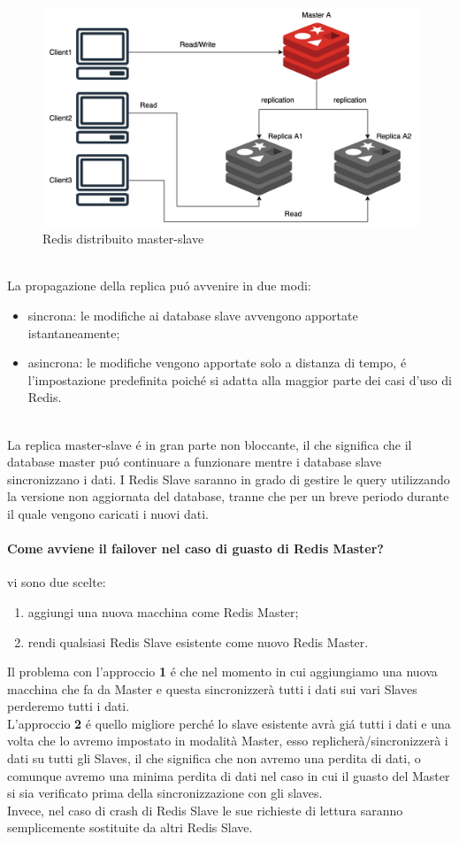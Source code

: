 \begin{figure}[H]
\includegraphics[width=1\textwidth]{img/masterslaveRedis}
\caption{Redis distribuito master-slave}
\end{figure}
\\
La propagazione della replica puó avvenire in due modi:
\begin{itemize}
    \item sincrona: le modifiche ai database slave avvengono apportate istantaneamente;
    \item asincrona: le modifiche vengono apportate solo a distanza di tempo, é l'impostazione predefinita poiché si adatta
    alla maggior parte dei casi d'uso di Redis.
\end{itemize}
\\
La replica master-slave é in gran parte non bloccante, il che significa che il database master puó continuare a funzionare
mentre i database slave sincronizzano i dati.
I Redis Slave saranno in grado di gestire le query utilizzando la versione non aggiornata del database, tranne che per un breve
periodo durante il quale vengono caricati i nuovi dati.

\paragraph{Come avviene il failover nel caso di guasto di Redis Master?\\}
vi sono due scelte:
\begin{enumerate}
    \item aggiungi una nuova macchina come Redis Master;
    \item rendi qualsiasi Redis Slave esistente come nuovo Redis Master.
\end{enumerate}
Il problema con l'approccio \textbf{1} é che nel momento in cui aggiungiamo una nuova macchina che fa da Master e questa sincronizzerà
tutti i dati sui vari Slaves perderemo tutti i dati.\\
L'approccio \textbf{2} é quello migliore perché lo slave esistente avrà giá tutti i dati e una volta che lo avremo impostato in modalità
Master, esso replicherà/sincronizzerà i dati su tutti gli Slaves, il che significa che non avremo una perdita di dati, o comunque
avremo una minima perdita di dati nel caso in cui il guasto del Master si sia verificato prima della sincronizzazione con gli slaves.
\\
Invece, nel caso di crash di Redis Slave le sue richieste di lettura saranno semplicemente sostituite da altri Redis Slave.

